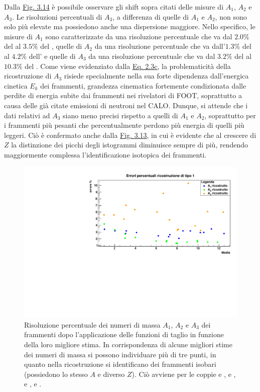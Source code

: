 \documentclass[12pt,a4paper,twoside]{report}
\begin{document}
	Dalla \hyperref[fig:number_mass_resolution]{Fig. 3.14} è possibile osservare gli shift sopra citati delle misure di $A_1$, $A_2$ e $A_3$. Le risoluzioni percentuali di $A_3$, a differenza di quelle di $A_1$ e $A_2$, non sono solo più elevate ma possiedono anche una dispersione maggiore. Nello specifico, le misure di $A_1$ sono caratterizzate da una risoluzione percentuale che va dal $2.0\%$ del  al $3.5\%$ del , quelle di $A_2$ da una risoluzione percentuale che va dall'$1.3\%$ del  al $4.2\%$ dell' e quelle di $A_3$ da una risoluzione percentuale che va dal $3.2\%$ del  al $10.3\%$ del . Come viene evidenziato dalla \hyperref[eq:a3]{Eq. 2.3c}, la problematicità della ricostruzione di $A_3$ risiede specialmente nella sua forte dipendenza dall'energica cinetica $E_k$ dei frammenti, grandezza cinematica fortemente condizionata dalle perdite di energia subite dai frammenti nei rivelatori di FOOT, soprattutto a causa delle già citate emissioni di neutroni nel CALO. Dunque, si attende che i dati relativi ad $A_3$ siano meno precisi rispetto a quelli di $A_1$ e $A_2$, soprattutto per i frammenti più pesanti che percentualmente perdono più energia di quelli più leggeri. Ciò è confermato anche dalla \hyperref[fig:a3_fragments_final]{Fig. 3.13}, in cui è evidente che al crescere di $Z$ la distinzione dei picchi degli istogrammi diminuisce sempre di più, rendendo maggiormente complessa l'identificazione isotopica dei frammenti.
	\begin{figure}[H]
		\centering
		\includegraphics[width=1.01\linewidth,center]{c_multigr_final.pdf}
		\caption{Risoluzione percentuale dei numeri di massa $A_1$, $A_2$ e $A_3$ dei frammenti dopo l'applicazione delle funzioni di taglio in funzione della loro migliore stima. In corrispondenza di alcune migliori stime dei numeri di massa si possono individuare più di tre punti, in quanto nella ricostruzione si identificano dei frammenti isobari (possiedono lo stesso $A$ e diverso $Z$). Ciò avviene per le coppie  e ,  e ,  e ,  e .}
		\label{fig:number_mass_resolution}
	\end{figure}
	
\end{document}
